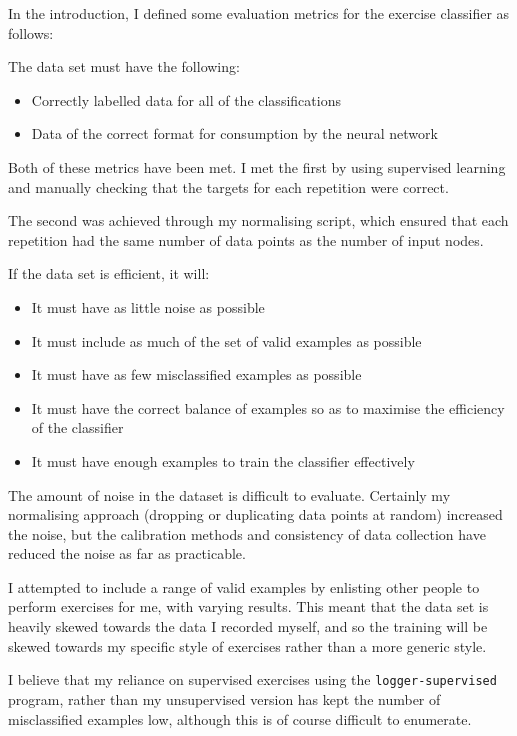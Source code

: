 \documentclass[a4paper]{article}
\begin{document}
In the introduction, I defined some evaluation metrics for the exercise classifier as follows:

The data set must have the following:

\begin{itemize}
\item Correctly labelled data for all of the classifications
\item Data of the correct format for consumption by the neural network
\end{itemize}

Both of these metrics have been met. I met the first by using supervised learning and manually checking that the targets for each repetition were correct.

The second was achieved through my normalising script, which ensured that each repetition had the same number of data points as the number of input nodes.

If the data set is efficient, it will:

\begin{itemize}
\item It must have as little noise as possible
\item It must include as much of the set of valid examples as possible
\item It must have as few misclassified examples as possible
\item It must have the correct balance of examples so as to maximise the efficiency of the classifier
\item It must have enough examples to train the classifier effectively
\end{itemize}

The amount of noise in the dataset is difficult to evaluate. Certainly my normalising approach (dropping or duplicating data points at random) increased the noise, but the calibration methods and consistency of data collection have reduced the noise as far as practicable.

I attempted to include a range of valid examples by enlisting other people to perform exercises for me, with varying results. This meant that the data set is heavily skewed towards the data I recorded myself, and so the training will be skewed towards my specific style of exercises rather than a more generic style.

I believe that my reliance on supervised exercises using the \lstinline{logger-supervised} program, rather than my unsupervised version has kept the number of misclassified examples low, although this is of course difficult to enumerate.
\end{document}
